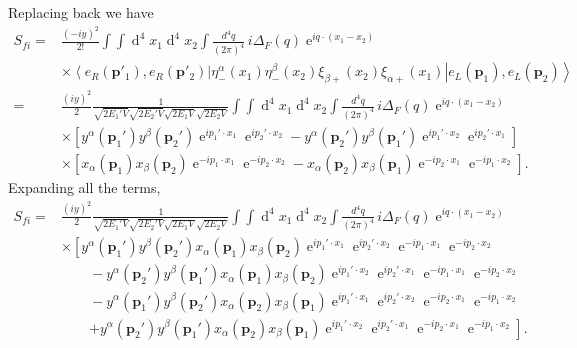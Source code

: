 Replacing back we have
\begin{align}
   S_{fi}
  =&\frac{\left( -iy \right)^{2}}{2!}\int\int \operatorname{d}^4x_1 \operatorname{d}^4x_2
\int\frac{d^4q}{(2\pi)^4}\,i\Delta_F(q)\operatorname{e}^{i q\cdot(x_1-x_2)} \nonumber\\
&\times\left\langle e_R\left(\mathbf{p}'_1\right), e_R \left(\mathbf{p}'_2\right) \right|
  \eta^{\alpha}_{-}(x_1) \eta^{\beta}_{-}(x_2)\xi_{\beta +}(x_2) \xi_{\alpha +}(x_1)
 \left| e_L \left(\mathbf{p}_1\right), e_L\left(\mathbf{p}_2\right) \right\rangle \nonumber\\
    =&\frac{\left( iy \right)^{2}}{2}\frac{1 }{\sqrt{2 E_1'V}\sqrt{2 E_2'V}\sqrt{2 E_1V}\sqrt{2 E_2V}}\int\int \operatorname{d}^4x_1 \operatorname{d}^4x_2
\int\frac{d^4q}{(2\pi)^4}\,i\Delta_F(q)\operatorname{e}^{i q\cdot(x_1-x_2)} \nonumber\\
&
 \times \left[ y^{\alpha}(\mathbf{p}_1')y^{\beta}(\mathbf{p}_2')
\operatorname{e}^{i p_1'\cdot x_1}\operatorname{e}^{i p_2'\cdot x_2}
- y^{\alpha}(\mathbf{p}_2')y^{\beta}(\mathbf{p}_1')
\operatorname{e}^{i p_1'\cdot x_2}\operatorname{e}^{i p_2'\cdot x_1}   \right] \nonumber\\
& \times \left[x_{\alpha}(\mathbf{p}_1)x_{\beta}(\mathbf{p}_2)
\operatorname{e}^{-i p_1\cdot x_1}\operatorname{e}^{-i p_2\cdot x_2} 
- x_{\alpha}(\mathbf{p}_2)x_{\beta}(\mathbf{p}_1)
\operatorname{e}^{-i p_2\cdot x_1}\operatorname{e}^{-i p_1\cdot x_2} \right].
\end{align}
Expanding all the terms,
\begin{align}
   S_{fi}
    =&\frac{\left( iy \right)^{2}}{2}\frac{1 }{\sqrt{2 E_1'V}\sqrt{2 E_2'V}\sqrt{2 E_1V}\sqrt{2 E_2V}}\int\int \operatorname{d}^4x_1 \operatorname{d}^4x_2
\int\frac{d^4q}{(2\pi)^4}\,i\Delta_F(q)\operatorname{e}^{i q\cdot(x_1-x_2)} \nonumber\\
&
 \times \left[ y^{\alpha}(\mathbf{p}_1')y^{\beta}(\mathbf{p}_2')x_{\alpha}(\mathbf{p}_1)x_{\beta}(\mathbf{p}_2)
\operatorname{e}^{i p_1'\cdot x_1}\operatorname{e}^{i p_2'\cdot x_2}
\operatorname{e}^{-i p_1\cdot x_1}\operatorname{e}^{-i p_2\cdot x_2}  \right. \nonumber\\
&\qquad- y^{\alpha}(\mathbf{p}_2')y^{\beta}(\mathbf{p}_1')x_{\alpha}(\mathbf{p}_1)x_{\beta}(\mathbf{p}_2)
\operatorname{e}^{i p_1'\cdot x_2}\operatorname{e}^{i p_2'\cdot x_1} 
\operatorname{e}^{-i p_1\cdot x_1}\operatorname{e}^{-i p_2\cdot x_2}  \nonumber\\
&\qquad -y^{\alpha}(\mathbf{p}_1')y^{\beta}(\mathbf{p}_2')x_{\alpha}(\mathbf{p}_2)x_{\beta}(\mathbf{p}_1)
\operatorname{e}^{i p_1'\cdot x_1}\operatorname{e}^{i p_2'\cdot x_2}
\operatorname{e}^{-i p_2\cdot x_1}\operatorname{e}^{-i p_1\cdot x_2} \nonumber\\
&\qquad\left. + y^{\alpha}(\mathbf{p}_2')y^{\beta}(\mathbf{p}_1')x_{\alpha}(\mathbf{p}_2)x_{\beta}(\mathbf{p}_1)
\operatorname{e}^{i p_1'\cdot x_2}\operatorname{e}^{i p_2'\cdot x_1}
\operatorname{e}^{-i p_2\cdot x_1}\operatorname{e}^{-i p_1\cdot x_2}   \right].
\end{align}
